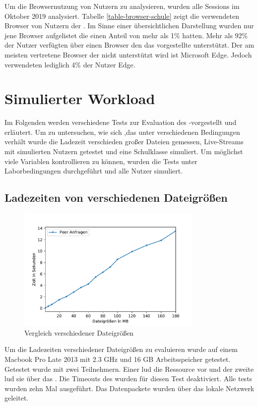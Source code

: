 Um die Browsernutzung von \schulCloud Nutzern zu analysieren, wurden alle Sessions im Oktober 2019 analysiert. Tabelle \ref{table-browser-schule} zeigt die verwendeten Browser von Nutzern der \schulCloud. Im Sinne einer übersichtlichen Darstellung wurden nur jene Browser aufgelistet die einen Anteil von mehr als 1\% hatten. Mehr als 92\% der Nutzer verfügten über einen Browser den das vorgestellte \pTp \cdn unterstützt. Der am meisten vertretene Browser der nicht unterstützt wird ist Microsoft Edge. Jedoch verwendeten lediglich 4\% der Nutzer Edge.
 
\section{Simulierter Workload}\label{e:sim}

Im Folgenden werden verschiedene Tests zur Evaluation des \pTp-\cdns vorgestellt und erläutert. Um zu untersuchen, wie sich ,das \cdn unter verschiedenen Bedingungen verhält wurde die Ladezeit verschieden großer Dateien gemessen, Live-Streams mit simulierten Nutzern getestet und eine Schulklasse simuliert. Um möglichst viele Variablen kontrollieren zu können, wurden die Tests unter Laborbedingungen durchgeführt und alle Nutzer simuliert.

\subsection{Ladezeiten von verschiedenen Dateigrößen} \label{e:filesize}
\begin{figure}[!h]
	\centering
	\includegraphics[width=0.8\textwidth]{figures/Timing_file_size}
	\caption[Vergleich verschiedener Dateigrößen]{Vergleich verschiedener Dateigrößen}
	\label{fig:timing_file_size}
\end{figure}

Um die Ladezeiten verschiedener Dateigrößen zu evaluieren wurde auf einem Macbook Pro Late 2013 mit 2.3 GHz und 16 GB Arbeitsspeicher getestet. 
Getestet wurde mit zwei Teilnehmern. Einer lud die Ressource vor und der zweite lud sie über das \pTp \cdn. Die Timeouts des \pTp \cdns wurden für diesen Test deaktiviert. Alle tests wurden zehn Mal ausgeführt. Das \pTp Datenpackete wurden über das lokale Netzwerk geleitet.


